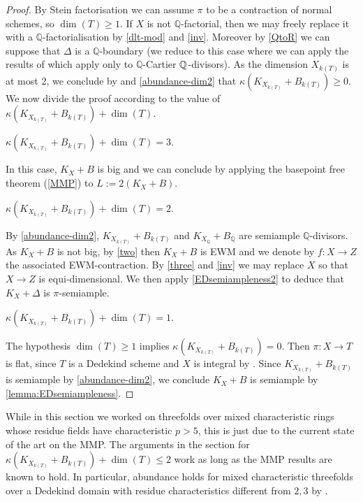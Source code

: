 \begin{proof}
	By Stein factorisation we can assume $\pi$ to be a contraction of normal schemes, so $\dim(T) \geq 1$.
	If $X$ is not $\mathbb{Q}$-factorial, then we may freely replace it with a $\mathbb{Q}$-factorialisation by \autoref{dlt-mod} and \autoref{inv}. Moreover by \autoref{QtoR} we can suppose that $\Delta$ is a $\mathbb{Q}$-boundary (we reduce to this case where we can apply the results of \cite{witaszek2020keels} which apply only to $\mathbb{Q}$-Cartier $\mathbb{Q}$-divisors).
	As the dimension $X_{k(T)}$ is at most 2, we conclude by \cite[Lemma 9.22]{bhatt2020} and \autoref{abundance-dim2} that $\kappa(K_{X_{k(T)}}+B_{k(T)}) \geq 0$. We now divide the proof according to the value of $\kappa(K_{X_{k(T)}}+B_{k(T)})+\dim (T)$.
	
	\begin{case} 
		$\kappa(K_{X_{k(T)}}+B_{k(T)})+\dim (T)=3$.
	\end{case}
	In this case, $K_X+B$ is big and we can conclude by applying the basepoint free theorem (\autoref{MMP}) to $L:=2(K_{X}+B)$.
	
	\begin{case}
		$\kappa(K_{X_{k(T)}}+B_{k(T)})+\dim (T)=2$.
	\end{case}
	By \autoref{abundance-dim2},  $K_{X_{k(T)}}+B_{k(T)}$ and $K_{X_\mathbb{Q}}+B_{\mathbb{Q}}$ are semiample $\mathbb{Q}$-divisors. As $K_X+B$ is not big, by \autoref{two} then $K_X+B$ is EWM and we denote by $f \colon X \to Z$ the associated EWM-contraction.
	By \autoref{three} and \autoref{inv} we may replace $X$ so that $X \to Z$ is equi-dimensional. We then apply \autoref{EDsemiampleness2} to deduce that $K_{X}+\Delta$ is $\pi$-semiample.
	
	\begin{case}
		$\kappa(K_{X_{k(T)}}+B_{k(T)})+\dim (T)=1$.
	\end{case} 
	The hypothesis $\dim (T) \geq 1$ implies  $\kappa(K_{X_{k(T)}}+B_{k(T)})=0$. Then $\pi \colon X \to T$ is flat, since $T$ is a Dedekind scheme and $X$ is integral by \cite[Proposition 9.7]{Ha77}. Since $K_{X_{{k(T)}}}+ B_{{k(T)}}$ is semiample by \autoref{abundance-dim2}, we conclude $K_X+B$ is semiample by \autoref{lemma:EDsemiampleness}. 
\end{proof}
	
	\begin{remark}
		While in this section we worked on threefolds over mixed characteristic rings whose residue fields have characteristic $p> 5$, this is just due to the current state of the art on the MMP. 
		The arguments in the section for $\kappa(K_{X_{k(T)}}+B_{k(T)})+\dim(T) \leq 2$ work as long as the MMP results are known to hold.
		In particular, abundance holds for mixed characteristic threefolds over a Dedekind domain with residue characteristics different from $2, 3$ by \cite{XX22}.
	\end{remark}
	
